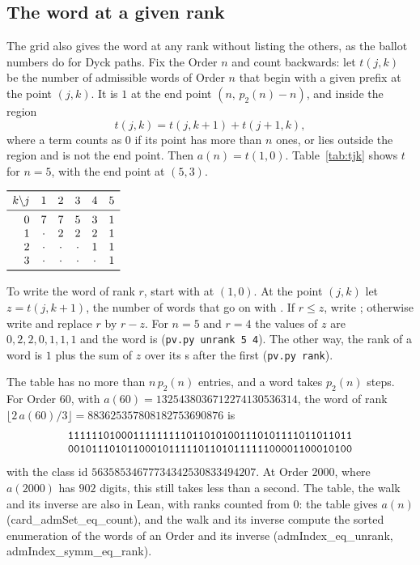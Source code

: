 \documentclass[11pt,a4paper,titlepage]{article}
\newcommand{\lean}[1]{\textsf{#1}}
\newcommand{\pv}[1]{\texttt{pv.py #1}}
\begin{document}
\subsection*{The word at a given rank}

The grid also gives the word at any rank without listing the others, as the
ballot numbers do for Dyck paths. Fix the Order $n$ and count backwards: let
$t(j,k)$ be the number of admissible words of Order $n$ that begin with a given
prefix at the point $(j,k)$. It is $1$ at the end point $(n,\, p_2(n) - n)$, and
inside the region
\[
t(j,k) = t(j,k+1) + t(j+1,k),
\]
where a term counts as $0$ if its point has more than $n$ ones, or lies outside
the region and is not the end point. Then $a(n) = t(1,0)$. Table~\ref{tab:tjk}
shows $t$ for $n = 5$, with the end point at $(5,3)$.

\begin{table}[htbp]
\centering
$\begin{array}{r ccccc}
\toprule
k \backslash j & 1 & 2 & 3 & 4 & 5 \\
\midrule
0 & 7 & 7 & 5 & 3 & 1 \\
1 & \cdot & 2 & 2 & 2 & 1 \\
2 & \cdot & \cdot & \cdot & 1 & 1 \\
3 & \cdot & \cdot & \cdot & \cdot & 1 \\
\bottomrule
\end{array}$
\caption{The backward count $t(j,k)$ for Order $5$: $j$ ones across, $k$ zeros down.}
\label{tab:tjk}
\end{table}

To write the word of rank $r$, start with  at $(1,0)$. At the point $(j,k)$
let $z = t(j, k+1)$, the number of words that go on with . If
$r \le z$, write ; otherwise write  and replace $r$ by $r - z$. For
$n = 5$ and $r = 4$ the values of $z$ are $0, 2, 2, 0, 1, 1, 1$ and the word is
 (\pv{unrank 5 4}). The other way, the rank of a word is $1$ plus
the sum of $z$ over its s after the first (\pv{rank}).

The table has no more than $n\,p_2(n)$ entries, and a word takes $p_2(n)$ steps.
For Order $60$, with $a(60) = 1325438036712274130536314$, the word of rank
$\lfloor 2\,a(60)/3 \rfloor = 883625357808182753690876$ is
\[
\begin{array}{l}
\text{\texttt{111111010001111111110110101001110101111011011011}} \\
\text{\texttt{001011101011000101111101101011111100001100010100}}
\end{array}
\]
with the class id $56358534677734342530833494207$. At Order $2000$, where $a(2000)$
has $902$ digits, this still takes less than a second. The table, the walk and
its inverse are also in Lean, with ranks counted from $0$: the table gives $a(n)$
(\lean{card\_admSet\_eq\_count}), and the walk and its inverse compute the sorted
enumeration of the words of an Order and its inverse (\lean{admIndex\_eq\_unrank},
\lean{admIndex\_symm\_eq\_rank}).
\end{document}
